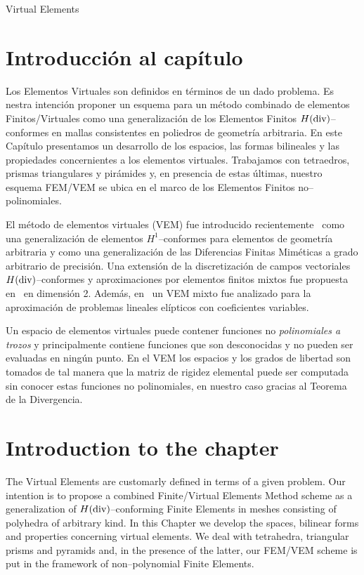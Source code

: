 \begin{chapter}{Virtual Elements}
\section*{Introducci\'on al cap\'itulo}
Los Elementos Virtuales son definidos en t\'erminos de un dado problema. 
Es nestra intenci\'on
proponer un esquema para un m\'etodo combinado 
de elementos Finitos/Virtuales
como una generalizaci\'on de los Elementos Finitos $H(\operatorname{\textrm{div}})$--conformes
en mallas consistentes en
poliedros de geome\-tr\'ia arbitraria. En este
Cap\'itulo presentamos un desarrollo de los espacios, las formas
bilineales y las propiedades concernientes a los  
elementos virtuales.
Trabajamos con tetraedros, prismas triangulares y pir\'amides y,
en presencia de estas \'ultimas,
nuestro esquema FEM/VEM se ubica en
el marco de los Elementos Finitos no--polinomiales.

El m\'etodo de elementos virtuales (VEM) 
fue introducido recientemente~\cite{MR2997471}
como una generalizaci\'on de elementos $H^1$--conformes 
para elementos de geome\-tr\'ia arbitraria y como una
generalizaci\'on de las Diferencias Finitas Mim\'eticas
a grado arbitrario de precisi\'on. Una extensi\'on de 
la discretizaci\'on de campos vectoriales $H(\operatorname{\textrm{div}})$--conformes
y aproximaciones por elementos finitos mixtos
fue propuesta en~\cite{bfm} en dimensi\'on 2. 
Adem\'as, en~\cite{MR3507271} un VEM mixto
fue analizado
para la aproximaci\'on de 
problemas lineales el\'ipticos con coeficientes variables.

Un espacio de elementos virtuales puede contener funciones
no \emph{polinomiales a trozos}
y principalmente contiene funciones
que son desconocidas y no pueden ser evaluadas en ning\'un punto.
En el VEM los espacios y los grados de libertad son tomados de tal manera
que la matriz de rigidez elemental puede ser computada
sin conocer estas funciones no polinomiales, en nuestro caso gracias 
al Teorema de la Divergencia.

\section*{Introduction to the chapter}
The Virtual Elements are customarly defined in terms of a given problem. Our
intention 
is to propose a combined Finite/Virtual Elements Method scheme
as a generalization of $H(\operatorname{\textrm{div}})$--conforming Finite Elements
in meshes consisting of polyhedra of arbitrary kind. In this Chapter we develop
the spaces, bilinear forms and properties concerning 
virtual elements.
We deal with tetrahedra, triangular prisms and pyramids and, in the presence of
the latter, our FEM/VEM scheme is put in the framework of 
non--polynomial Finite Elements.


\end{chapter}
